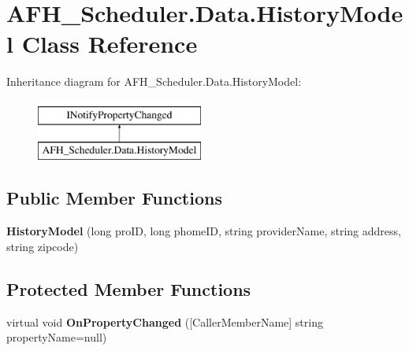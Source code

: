 \section{A\+F\+H\+\_\+\+Scheduler.\+Data.\+History\+Model Class Reference}
\label{class_a_f_h___scheduler_1_1_data_1_1_history_model}
Inheritance diagram for A\+F\+H\+\_\+\+Scheduler.\+Data.\+History\+Model\+:\begin{figure}[H]
\begin{center}
\leavevmode
\includegraphics[height=2.000000cm]{class_a_f_h___scheduler_1_1_data_1_1_history_model}
\end{center}
\end{figure}
\subsection*{Public Member Functions}
\begin{DoxyCompactItemize}
\item 
\mbox{\label{class_a_f_h___scheduler_1_1_data_1_1_history_model_a917360166ea78472b07f1bd8e2f3350c}} 
{\bfseries History\+Model} (long pro\+ID, long phome\+ID, string provider\+Name, string address, string zipcode)
\end{DoxyCompactItemize}
\subsection*{Protected Member Functions}
\begin{DoxyCompactItemize}
\item 
\mbox{\label{class_a_f_h___scheduler_1_1_data_1_1_history_model_a85e784dc52fc237b01f7c577253e1025}} 
virtual void {\bfseries On\+Property\+Changed} ([Caller\+Member\+Name] string property\+Name=null)
\end{DoxyCompactItemize}
